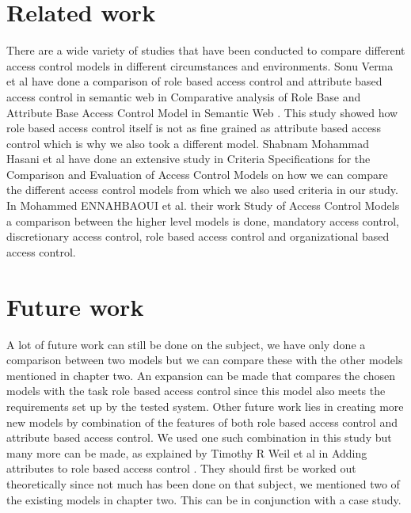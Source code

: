 \section{Related work}
There are a wide variety of studies that have been conducted to compare different access control models in different circumstances and environments.
Sonu Verma et al have done a comparison of role based access control and attribute based access control in semantic web in Comparative analysis of Role Base and Attribute Base Access Control Model in Semantic Web \cite{Related1}.
This study showed how role based access control itself is not as fine grained as attribute based access control which is why we also took a different model.
Shabnam Mohammad Hasani et al have done an extensive study in Criteria Specifications for the Comparison and
Evaluation of Access Control Models on how we can compare the different access control models \cite{Related3} from which we also used criteria in our study.
In Mohammed ENNAHBAOUI et al. their work Study of Access Control Models \cite{Related2} a comparison between the higher level models is done, mandatory access control, discretionary access control, role based access control and organizational based access control.



\section{Future work}
A lot of future work can still be done on the subject, we have only done a comparison between two models but we can compare these with the other models mentioned in chapter two.
An expansion can be made that compares the chosen models with the task role based access control since this model also meets the requirements set up by the tested system.
Other future work lies in creating more new models by combination of the features of both role based access control and attribute based access control.
We used one such combination in this study but many more can be made, as explained by Timothy R Weil et al in Adding attributes to role based access control \cite{Combined1}.
They should first be worked out theoretically since not much has been done on that subject, we mentioned two of the existing models in chapter two.
This can be in conjunction with a case study.